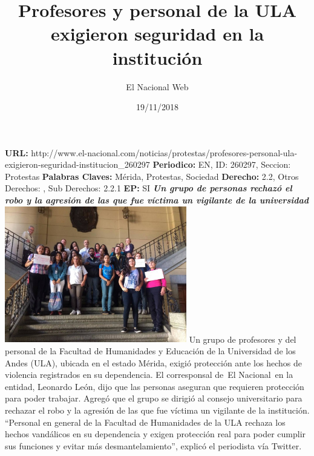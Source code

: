 \documentclass{article}%
\title{\textbf{Profesores y personal de la ULA exigieron seguridad en la institución}}%
\author{El Nacional Web}%
\date{19/11/2018}%
\begin{document}
%
\normalsize%
\maketitle%
\textbf{URL: }%
http://www.el{-}nacional.com/noticias/protestas/profesores{-}personal{-}ula{-}exigieron{-}seguridad{-}institucion\_260297\newline%
%
\textbf{Periodico: }%
EN, %
ID: %
260297, %
Seccion: %
Protestas\newline%
%
\textbf{Palabras Claves: }%
Mérida, Protestas, Sociedad\newline%
%
\textbf{Derecho: }%
2.2, %
Otros Derechos: %
, %
Sub Derechos: %
2.2.1\newline%
%
\textbf{EP: }%
SI\newline%
\newline%
%
\textbf{\textit{Un grupo de personas rechazó el robo y la agresión de las que fue víctima un vigilante de la universidad}}%
\newline%
\newline%
%
\includegraphics[width=300px]{48.jpg}%
\newline%
%
Un grupo de profesores y del personal de la Facultad de Humanidades y Educación de la Universidad de los Andes (ULA), ubicada en el estado Mérida, exigió protección ante los hechos de violencia registrados en su dependencia.%
\newline%
%
El corresponsal de~El Nacional~en la entidad, Leonardo León, dijo que las personas aseguran que requieren protección para poder trabajar.%
\newline%
%
Agregó que el grupo se dirigió al consejo universitario para rechazar el robo y la agresión de las que fue víctima un vigilante de la institución.%
\newline%
%
“Personal en general de la Facultad de Humanidades de la ULA rechaza los hechos vandálicos en su dependencia y exigen protección real para poder cumplir sus funciones y evitar más desmantelamiento”, explicó el periodista vía Twitter.%
\newline%
%
\end{document}
